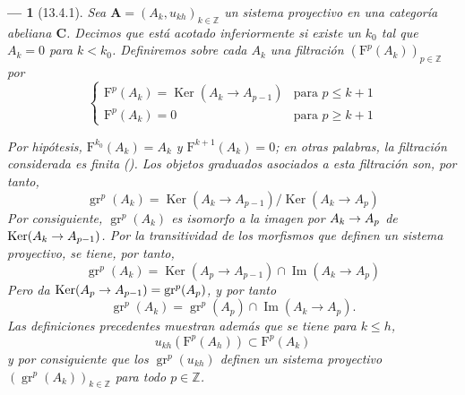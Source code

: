 \documentclass[10pt,oneside,openany]{book}
\theoremstyle{egaenv}\newtheorem*{env}{---}
\theoremstyle{egastatement}
\theoremstyle{egadescription}
\newcommand{\oldpage}[2][]{\marginnote{\normalfont\scriptsize\textbf{#1}\,|\,#2}\ignorespaces}
\renewcommand{\leq}{\leqslant}
\renewcommand{\geq}{\geqslant}
\renewcommand{\to}{\mathchoice{\longrightarrow}{\rightarrow}{\rightarrow}{\rightarrow}}
\begin{document}
\begin{env}[13.4.1]
\label{0.13.4.1}
\label{0.13.4.1-fr}
Sea
$\mathbf A=(A_k,u_{kh})_{k\in\mathbb Z}$ un sistema proyectivo en una
categoría abeliana $\boldsymbol{C}$.
Decimos que está \emph{acotado inferiormente} si existe un $k_0$ tal que
$A_k=0$ para $k<k_0$. Definiremos sobre cada $A_k$ una \emph{filtración} $(\mathrm F^p(A_k))_{p\in\mathbb Z}$ por
\begin{equation}
\label{0.13.4.1.1-fr}
\tag{13.4.1.1}
\begin{cases}
\mathrm F^p(A_k)=\operatorname{Ker}(A_k\longrightarrow A_{p-1})&\text{para }p\leq k+1\\
\mathrm F^p(A_k)=0&\text{para }p\geq k+1
\end{cases}
\end{equation}

\oldpage[0\textsubscript{III}]{70}
Por hipótesis,
$\mathrm F^{k_0}(A_k)=A_k$ y
$\mathrm F^{k+1}(A_k)=0$; en otras palabras, la filtración considerada
es finita ().
Los objetos graduados asociados a esta filtración son, por tanto,
\[
\operatorname{gr}^p(A_k)=
\operatorname{Ker}(A_k\longrightarrow A_{p-1})
/\operatorname{Ker}(A_k\longrightarrow A_p)
\]
Por consiguiente, $\operatorname{gr}^p(A_k)$ es isomorfo a la imagen por
$A_k\to A_p$ de
$\operatorname{Ker}(A_k\to A_{p-1})$.
Por la transitividad de los morfismos que definen un sistema proyectivo,
se tiene, por tanto,
\begin{equation}
\label{0.13.4.1.2-fr}
\tag{13.4.1.2}
\operatorname{gr}^p(A_k)=
\operatorname{Ker}(A_p\longrightarrow A_{p-1})
\cap\operatorname{Im}(A_k\longrightarrow A_p)
\end{equation}
Pero  da
$\operatorname{Ker}(A_p\to A_{p-1})=\operatorname{gr}^p(A_p)$, y por tanto
\begin{equation}
\label{0.13.4.1.3-fr}
\tag{13.4.1.3}
\operatorname{gr}^p(A_k)=
\operatorname{gr}^p(A_p)\cap\operatorname{Im}(A_k\longrightarrow A_p).
\end{equation}
Las definiciones precedentes muestran además que se tiene para $k\leq h$,
\[
u_{kh}(\mathrm F^p(A_h))\subset\mathrm F^p(A_k)
\]
y por consiguiente que los $\operatorname{gr}^p(u_{kh})$ definen un sistema proyectivo
$(\operatorname{gr}^p(A_k))_{k\in\mathbb Z}$ para todo $p\in\mathbb Z$.
\end{env}
\end{document}
